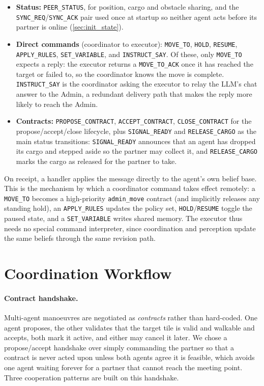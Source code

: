 \begin{itemize}
  \item \textbf{Status:} \texttt{PEER\_STATUS}, for position, cargo and obstacle
        sharing, and the \texttt{SYNC\_REQ}/\texttt{SYNC\_ACK} pair used once at
        startup so neither agent acts before its partner is online (\cref{sec:init_state}).
  \item \textbf{Direct commands} (coordinator to executor): \texttt{MOVE\_TO},
        \texttt{HOLD}, \texttt{RESUME}, \texttt{APPLY\_RULES}, \texttt{SET\_VARIABLE},
        and \texttt{INSTRUCT\_SAY}. Of these, only \texttt{MOVE\_TO} expects a reply:
        the executor returns a \texttt{MOVE\_TO\_ACK} once it has reached the target
        or failed to, so the coordinator knows the move is complete.
        \texttt{INSTRUCT\_SAY} is the coordinator asking the executor to relay the
        LLM's chat answer to the Admin, a redundant delivery path that makes the
        reply more likely to reach the Admin.
  \item \textbf{Contracts:} \texttt{PROPOSE\_CONTRACT}, \texttt{ACCEPT\_CONTRACT},
        \texttt{CLOSE\_CONTRACT} for the propose/accept/close lifecycle, plus
        \texttt{SIGNAL\_READY} and \texttt{RELEASE\_CARGO} as the main status transitions: 
        \texttt{SIGNAL\_READY} announces that an agent has dropped its cargo and stepped aside so the partner may
        collect it, and \texttt{RELEASE\_CARGO} marks the cargo as released for the
        partner to take.
\end{itemize}

On receipt, a handler applies the message directly to the agent's own belief base.
This is the mechanism by which a coordinator command takes effect remotely: a
\texttt{MOVE\_TO} becomes a high-priority \texttt{admin\_move} contract (and
implicitly releases any standing hold), an \texttt{APPLY\_RULES} updates the policy
set, \texttt{HOLD}/\texttt{RESUME} toggle the paused state, and a \texttt{SET\_VARIABLE}
writes shared memory. The executor thus needs no special command interpreter, since
coordination and perception update the same beliefs through the same revision path.

\section{Coordination Workflow}
\label{sec:coord-workflow}
\paragraph{Contract handshake.} Multi-agent manoeuvres are negotiated as
\emph{contracts} rather than hard-coded. One agent proposes, the other validates that 
the target tile is valid and walkable and accepts, both mark it active, and either may cancel it
later. We chose a propose/accept handshake over simply commanding the partner so that
a contract is never acted upon unless both agents agree it is feasible, which avoids
one agent waiting forever for a partner that cannot reach the meeting point. Three
cooperation patterns are built on this handshake.

